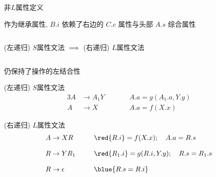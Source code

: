 \begin{frame}{}
  \begin{center}
    非$L$属性定义

    \vspace{0.80cm}
    作为继承属性, $B.i$ 依赖了右边的 $C.c$ 属性与头部 $A.s$ 综合属性
  \end{center}
\end{frame}

\begin{frame}{}
  \begin{center}


    \pause
    \begin{columns}
    \end{columns}
  \end{center}
\end{frame}

\begin{frame}{}
  \begin{center}
    (左递归) $S$属性文法 $\implies$ (右递归) $L$属性文法

    \begin{columns}
    \end{columns}

    \vspace{0.60cm}
    仍保持了操作的左结合性
  \end{center}
\end{frame}

\begin{frame}{}
  \begin{center}
    (左递归) $S$属性文法
    \begin{alignat*}{3}
      A &\to A_{1} Y \qquad && A.a = g(A_{1}.a, Y.y) \\[8pt]
      A &\to X && A.a = f(X.x)
    \end{alignat*}

    \pause
    \vspace{0.80cm}
    (右递归) $L$属性文法
    \begin{alignat*}{3}
      A &\to XR \qquad && \red{R.i} = f(X.x);\quad A.a = R.s \\[8pt]
      R &\to YR_{1} && \red{R_{1}.i} = g(R.i, Y.y);\quad R.s = R_{1}.s \\[8pt]
      R &\to \epsilon && \blue{R.s = R.i}
    \end{alignat*}
  \end{center}
\end{frame}

